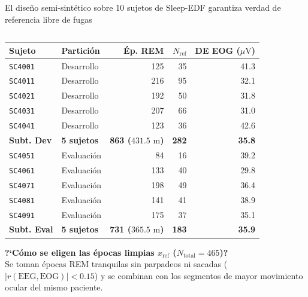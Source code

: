 \documentclass[aspectratio=169,9pt]{beamer}
\begin{document}
\begin{frame}{El dise\~no semi-sint\'etico sobre 10 sujetos de Sleep-EDF garantiza verdad de referencia libre de fugas}
\begin{columns}[T,onlytextwidth]
    \begin{column}{0.41\textwidth}
      \begin{tcolorbox}[basecard, title={\scriptsize\bfseries Partici\'on por Sujeto (\textit{Sleep-EDF v1.0.0} [1])}, colbacktitle=UDTeal!85!black, coltitle=white]
        \tiny
        \setlength{\tabcolsep}{2.8pt}
        \renewcommand{\arraystretch}{1.1}
        \begin{tabularx}{\linewidth}{@{}l Y r r r@{}}
          \toprule
          \textbf{Sujeto} & \textbf{Partici\'on} & \textbf{\'Ep. REM} & \textbf{$N_{\text{ref}}$} & \textbf{DE EOG ($\mu\text{V}$)} \\
          \midrule
          \texttt{SC4001} & Desarrollo & 125 & 35 & 41.3 \\
          \texttt{SC4011} & Desarrollo & 216 & 95 & 32.1 \\
          \texttt{SC4021} & Desarrollo & 192 & 50 & 31.8 \\
          \texttt{SC4031} & Desarrollo & 207 & 66 & 31.0 \\
          \texttt{SC4041} & Desarrollo & 123 & 36 & 42.6 \\
          \midrule
          \textbf{Subt. Dev} & \textbf{5 sujetos} & \textbf{863 ($431.5\text{ m}$)} & \textbf{282} & \textbf{35.8} \\
          \midrule
          \texttt{SC4051} & Evaluaci\'on & 84 & 16 & 39.2 \\
          \texttt{SC4061} & Evaluaci\'on & 133 & 40 & 29.8 \\
          \texttt{SC4071} & Evaluaci\'on & 198 & 49 & 36.4 \\
          \texttt{SC4081} & Evaluaci\'on & 141 & 41 & 38.9 \\
          \texttt{SC4091} & Evaluaci\'on & 175 & 37 & 35.1 \\
          \midrule
          \textbf{Subt. Eval} & \textbf{5 sujetos} & \textbf{731 ($365.5\text{ m}$)} & \textbf{183} & \textbf{35.9} \\
          \bottomrule
        \end{tabularx}
      \end{tcolorbox}
      \vspace{0.04cm}
      \begin{tcolorbox}[tealcard]
        \tiny
        \textbf{?`C\'omo se eligen las \'epocas limpias $x_{\text{ref}}$ ($N_{\text{total}}=465$)?}\\
        Se toman \'epocas REM tranquilas sin parpadeos ni sacadas ($|r(\text{EEG}, \text{EOG})| < 0.15$) y se combinan con los segmentos de mayor movimiento ocular del mismo paciente.
      \end{tcolorbox}
    \end{column}
  \end{columns}
\end{frame}
\end{document}
